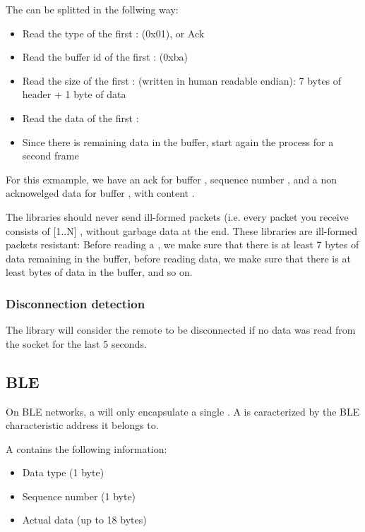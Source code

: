 The   can be splitted in the follwing way:\
\begin{itemize}
\item{Read the type of the first : \ARCode(0x01), or Ack}
\item{Read the buffer id of the first : \ARCode(0xba)}
\item{Read the size of the first : \ARCode{0x00000008} (written in human readable endian): 7 bytes of header + 1 byte of data}
\item{Read the data of the first \ARCode{frame}: \ARCode{0x42}}
\item{Since there is remaining data in the buffer, start again the process for a second frame}
\end{itemize}

For this exmample, we have an ack for buffer , sequence number , and a non acknowelged data for buffer , with content .


The  libraries should never send ill-formed packets (i.e. every packet you receive consists of [1..N] , without garbage data at the end. These libraries are ill-formed packets resistant: Before reading a , we make sure that there is at least 7 bytes of data remaining in the buffer, before reading data, we make sure that there is at least  bytes of data in the buffer, and so on.

\subsubsection{Disconnection detection}

The  library will consider the remote to be disconnected if no data was read from the socket for the last 5 seconds.

\subsection{BLE}

On BLE networks, a  will only encapsulate a single . A  is caracterized by the BLE characteristic address it belongs to.


A  contains the following information:
\begin{itemize}
\item{Data type (1 byte)}
\item{Sequence number (1 byte)}
\item{Actual data (up to 18 bytes)}
\end{itemize}

